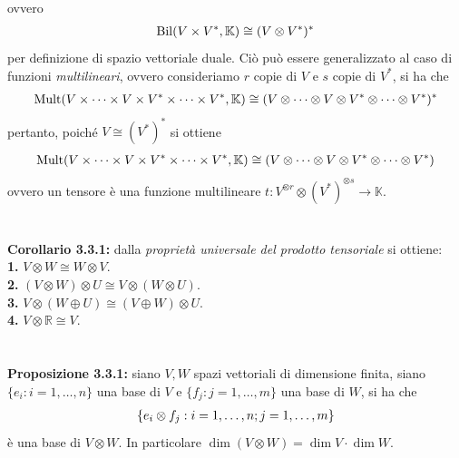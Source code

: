 \documentclass{article}
\begin{document}
ovvero
\begin{gather}
    \mathrm{Bil}(V \times V^*, \mathbb{K}) \cong (V \otimes V^*)^* \notag
\end{gather}
per definizione di spazio vettoriale duale. Ciò può essere generalizzato al caso di funzioni \textit{multilineari}, ovvero consideriamo $r$ copie di $V$ e $s$ copie di $V^*$, si ha che
\begin{gather}
    \mathrm{Mult}(V \times \dots \times V \times V^* \times \dots \times V^*, \mathbb{K}) \cong (V \otimes \dots \otimes V \otimes V^* \otimes \dots \otimes V^*)^* \notag
\end{gather}
pertanto, poiché $V \cong (V^*)^*$ si ottiene
\begin{gather}
    \mathrm{Mult}(V \times \dots \times V \times V^* \times \dots \times V^*, \mathbb{K}) \cong (V \otimes \dots \otimes V \otimes V^* \otimes \dots \otimes V^*) \notag
\end{gather}
ovvero un tensore è una funzione multilineare $t : V^{\otimes r} \otimes (V^*)^{\otimes s} \longrightarrow \mathbb{K}$. \\ \\ \\
\textbf{Corollario 3.3.1:} dalla \textit{proprietà universale del prodotto tensoriale} si ottiene: \\
\textbf{1.} $V \otimes W \cong W \otimes V$. \\
\textbf{2.} $(V \otimes W) \otimes U \cong V \otimes (W \otimes U)$. \\
\textbf{3.} $V \otimes (W \oplus U) \cong (V \oplus W) \otimes U$. \\
\textbf{4.} $V \otimes \mathbb{R} \cong V$. \\ \\ \\
\textbf{Proposizione 3.3.1:} siano $V, W$ spazi vettoriali di dimensione finita, siano $\{ e_i : i = 1, \dots, n \}$ una base di $V$ e $\{ f_j : j = 1, \dots, m \}$ una base di $W$, si ha che
\begin{gather}
    \{ e_i \otimes f_j : i = 1, \dots, n; j = 1, \dots, m \} \notag
\end{gather}
è una base di $V \otimes W$. In particolare $\dim (V \otimes W) = \dim V \cdot \dim W$. \\
\end{document}

